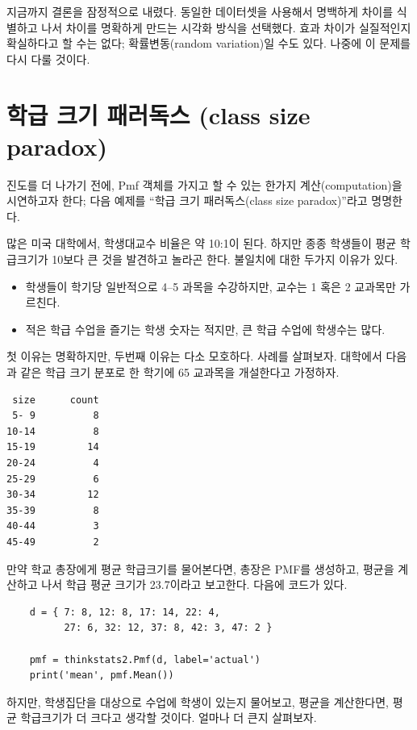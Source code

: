 지금까지 결론을 잠정적으로 내렸다. 동일한 데이터셋을 사용해서 명백하게 차이를 식별하고 나서 차이를 명확하게 만드는 시각화 방식을 선택했다. 효과 차이가 실질적인지 확실하다고 할 수는 없다; 확률변동(random variation)일 수도 있다. 나중에 이 문제를 다시 다룰 것이다.


\section{학급 크기 패러독스 (class size paradox)}

진도를 더 나가기 전에, Pmf 객체를 가지고 할 수 있는 한가지 계산(computation)을 시연하고자 한다; 다음 예제를 ``학급 크기 패러독스(class size paradox)''라고 명명한다.

많은 미국 대학에서, 학생대교수 비율은 약 10:1이 된다. 
하지만 종종 학생들이 평균 학급크기가 10보다 큰 것을 발견하고 놀라곤 한다.
불일치에 대한 두가지 이유가 있다.

\begin{itemize}

\item 학생들이 학기당 일반적으로 4--5 과목을 수강하지만, 교수는 1 혹은 2 교과목만 가르친다. 

\item 적은 학급 수업을 즐기는 학생 숫자는 적지만, 큰 학급 수업에 학생수는 많다.
\end{itemize}

첫 이유는 명확하지만, 두번째 이유는 다소 모호하다. 사례를 살펴보자. 대학에서 다음과 같은 학급 크기 분포로 한 학기에 65 교과목을 개설한다고 가정하자.

%
\begin{verbatim}
 size      count
 5- 9          8
10-14          8
15-19         14
20-24          4
25-29          6
30-34         12
35-39          8
40-44          3
45-49          2
\end{verbatim}

만약 학교 총장에게 평균 학급크기를 물어본다면, 총장은 PMF를 생성하고, 평균을 계산하고 나서 학급 평균 크기가 23.7이라고 보고한다. 다음에 코드가 있다.

\begin{verbatim}
    d = { 7: 8, 12: 8, 17: 14, 22: 4, 
          27: 6, 32: 12, 37: 8, 42: 3, 47: 2 }

    pmf = thinkstats2.Pmf(d, label='actual')
    print('mean', pmf.Mean())
\end{verbatim}

하지만, 학생집단을 대상으로 수업에 학생이 있는지 물어보고, 평균을 계산한다면, 평균 학급크기가 더 크다고 생각할 것이다. 얼마나 더 큰지 살펴보자.

